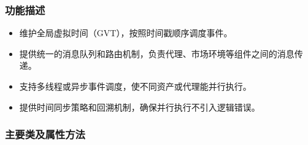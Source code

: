 \subsubsection{功能描述}
\begin{itemize}
  \item 维护全局虚拟时间（GVT），按照时间戳顺序调度事件。
  \item 提供统一的消息队列和路由机制，负责代理、市场环境等组件之间的消息传递。
  \item 支持多线程或异步事件调度，使不同资产或代理能并行执行。
  \item 提供时间同步策略和回溯机制，确保并行执行不引入逻辑错误。
\end{itemize}

\subsubsection{主要类及属性方法}

